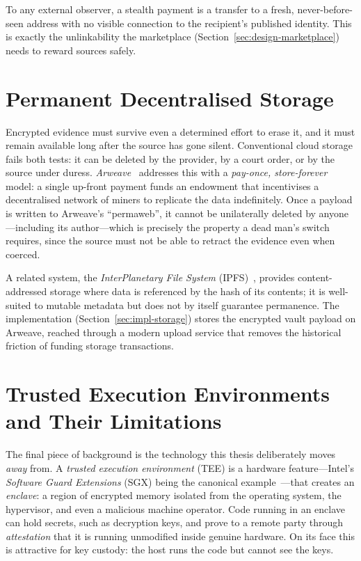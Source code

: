 To any external observer, a stealth payment is a transfer to a fresh,
never-before-seen address with no visible connection to the recipient's published
identity. This is exactly the unlinkability the marketplace
(Section~\ref{sec:design-marketplace}) needs to reward sources safely.

\section{Permanent Decentralised Storage}
\label{sec:bg-storage}

Encrypted evidence must survive even a determined effort to erase it, and it must
remain available long after the source has gone silent. Conventional cloud
storage fails both tests: it can be deleted by the provider, by a court order, or
by the source under duress. \emph{Arweave}~\cite{arweave} addresses this with a
\emph{pay-once, store-forever} model: a single up-front payment funds an
endowment that incentivises a decentralised network of miners to replicate the
data indefinitely. Once a payload is written to Arweave's ``permaweb'', it cannot
be unilaterally deleted by anyone---including its author---which is precisely the
property a dead man's switch requires, since the source must not be able to
retract the evidence even when coerced.

A related system, the \emph{InterPlanetary File System}
(IPFS)~\cite{benet2014ipfs}, provides content-addressed storage where data is
referenced by the hash of its contents; it is well-suited to mutable metadata but
does not by itself guarantee permanence. The implementation
(Section~\ref{sec:impl-storage}) stores the encrypted vault payload on Arweave,
reached through a modern upload service that removes the historical friction of
funding storage transactions.

\section{Trusted Execution Environments and Their Limitations}
\label{sec:bg-tee}

The final piece of background is the technology this thesis deliberately moves
\emph{away} from. A \emph{trusted execution environment} (TEE) is a hardware
feature---Intel's \emph{Software Guard Extensions} (SGX) being the canonical
example~\cite{costan2016sgx}---that creates an \emph{enclave}: a region of
encrypted memory isolated from the operating system, the hypervisor, and even a
malicious machine operator. Code running in an enclave can hold secrets, such as
decryption keys, and prove to a remote party through \emph{attestation} that it
is running unmodified inside genuine hardware. On its face this is attractive for
key custody: the host runs the code but cannot see the keys.

